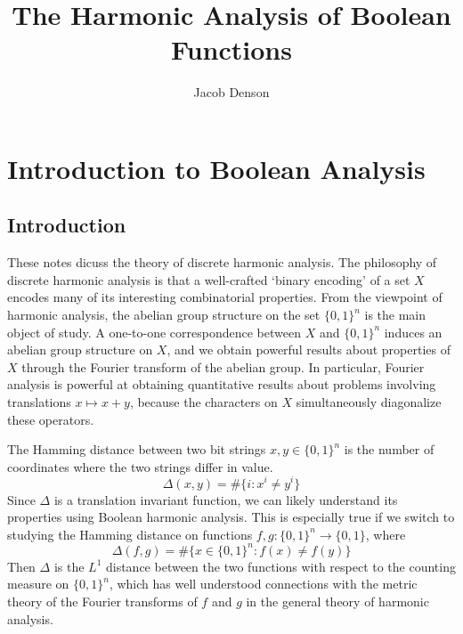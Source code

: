 

\title{The Harmonic Analysis of Boolean Functions}
\author{Jacob Denson}




\maketitle

\tableofcontents


\chapter{Introduction to Boolean Analysis}

\section{Introduction}

These notes dicuss the theory of discrete harmonic analysis. The philosophy of discrete harmonic analysis is that a well-crafted `binary encoding' of a set $X$ encodes many of its interesting combinatorial properties. From the viewpoint of harmonic analysis, the abelian group structure on the set $\{ 0,1 \}^n$ is the main object of study. A one-to-one correspondence between $X$ and $\{ 0,1 \}^n$ induces an abelian group structure on $X$, and we obtain powerful results about properties of $X$ through the Fourier transform of the abelian group. In particular, Fourier analysis is powerful at obtaining quantitative results about problems involving translations $x \mapsto x  +y$, because the characters on $X$ simultaneously diagonalize these operators.

\begin{example}
    The Hamming distance between two bit strings $x, y \in \{ 0, 1 \}^n$ is the number of coordinates where the two strings differ in value.
    \[ \Delta(x,y) = \# \{ i : x^i \neq y^i \} \]
    Since $\Delta$ is a translation invariant function, we can likely understand its properties using Boolean harmonic analysis. This is especially true if we switch to studying the Hamming distance on functions $f,g: \{ 0,1 \}^n \to \{ 0, 1 \}$, where
    \[ \Delta(f,g) = \# \{ x \in \{ 0, 1 \}^n : f(x) \neq f(y) \} \]
    Then $\Delta$ is the $L^1$ distance between the two functions with respect to the counting measure on $\{ 0, 1 \}^n$, which has well understood connections with the metric theory of the Fourier transforms of $f$ and $g$ in the general theory of harmonic analysis.
\end{example}

